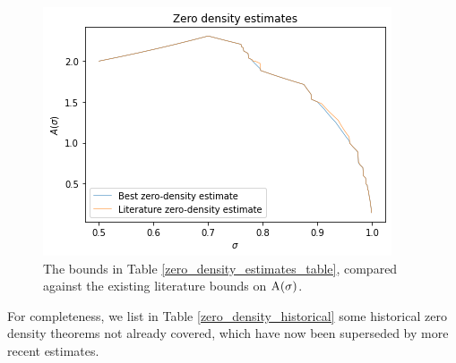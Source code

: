 \begin{figure}
    \centering
    \includegraphics[width=0.5\linewidth]{chapter/zero_density_estimate_plot.png}
    \caption{The bounds in Table \ref{zero_density_estimates_table}, compared against the existing literature bounds on $\mathrm{A}(\sigma)$.}
    \label{fig:zero_density_estimate}
\end{figure}

For completeness, we list in Table \ref{zero_density_historical} some historical zero density theorems not already covered, which have now been superseded by more recent estimates.

